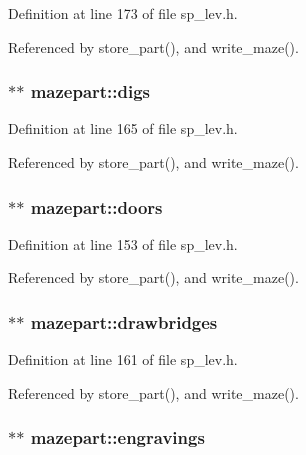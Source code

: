 Definition at line 173 of file sp\+\_\+lev.\+h.



Referenced by store\+\_\+part(), and write\+\_\+maze().

\hypertarget{structmazepart_a0650f683ebb57c5e13363e08e9d2e69e}{
\subsubsection[{digs}]{$\ast$$\ast$ mazepart\+::digs}}\label{structmazepart_a0650f683ebb57c5e13363e08e9d2e69e}


Definition at line 165 of file sp\+\_\+lev.\+h.



Referenced by store\+\_\+part(), and write\+\_\+maze().

\hypertarget{structmazepart_a7254a28f45dca92b48133fa8d0beb46c}{
\subsubsection[{doors}]{$\ast$$\ast$ mazepart\+::doors}}\label{structmazepart_a7254a28f45dca92b48133fa8d0beb46c}


Definition at line 153 of file sp\+\_\+lev.\+h.



Referenced by store\+\_\+part(), and write\+\_\+maze().

\hypertarget{structmazepart_a5cbbfc2dfa9f3876990b7008b2051704}{
\subsubsection[{drawbridges}]{$\ast$$\ast$ mazepart\+::drawbridges}}\label{structmazepart_a5cbbfc2dfa9f3876990b7008b2051704}


Definition at line 161 of file sp\+\_\+lev.\+h.



Referenced by store\+\_\+part(), and write\+\_\+maze().

\hypertarget{structmazepart_a2eacbada43de2597cde686d73151b6d6}{
\subsubsection[{engravings}]{$\ast$$\ast$ mazepart\+::engravings}}\label{structmazepart_a2eacbada43de2597cde686d73151b6d6}


